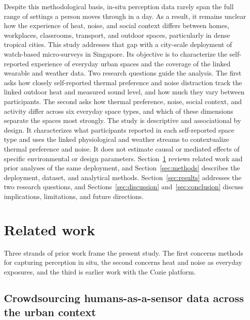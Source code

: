 \documentclass[]{interact}
\begin{document}
Despite this methodological basis, in-situ perception data rarely span the full range of settings a person moves through in a day.
As a result, it remains unclear how the experience of heat, noise, and social context differs between homes, workplaces, classrooms, transport, and outdoor spaces, particularly in dense tropical cities.
This study addresses that gap with a city-scale deployment of watch-based micro-surveys in Singapore.
Its objective is to characterize the self-reported experience of everyday urban spaces and the coverage of the linked wearable and weather data.
Two research questions guide the analysis.
The first asks how closely self-reported thermal preference and noise distraction track the linked outdoor heat and measured sound level, and how much they vary between participants.
The second asks how thermal preference, noise, social context, and activity differ across six everyday space types, and which of these dimensions separate the spaces most strongly.
The study is descriptive and associational by design.
It characterizes what participants reported in each self-reported space type and uses the linked physiological and weather streams to contextualize thermal preference and noise.
It does not estimate causal or mediated effects of specific environmental or design parameters.
Section~\ref{sec:related-work} reviews related work and prior analyses of the same deployment, and Section~\ref{sec:methods} describes the deployment, dataset, and analytical methods.
Section~\ref{sec:results} addresses the two research questions, and Sections~\ref{sec:discussion} and~\ref{sec:conclusion} discuss implications, limitations, and future directions.

\section{Related work}\label{sec:related-work}

Three strands of prior work frame the present study.
The first concerns methods for capturing perception in situ, the second concerns heat and noise as everyday exposures, and the third is earlier work with the Cozie platform.

\subsection{Crowdsourcing humans-as-a-sensor data across the urban context}\label{sec:crowdsourcing}
\end{document}
